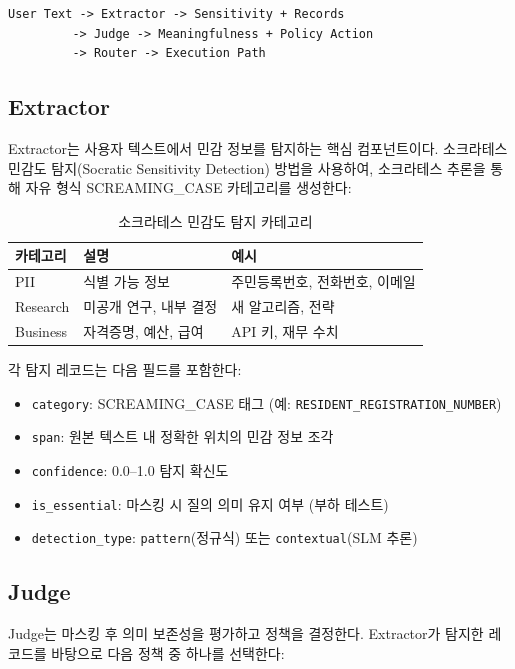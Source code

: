 \documentclass[11pt,a4paper]{article}
\begin{document}
\begin{verbatim}
User Text -> Extractor -> Sensitivity + Records
         -> Judge -> Meaningfulness + Policy Action
         -> Router -> Execution Path
\end{verbatim}

\subsection{Extractor}

Extractor는 사용자 텍스트에서 민감 정보를 탐지하는 핵심 컴포넌트이다. 소크라테스 민감도 탐지(Socratic Sensitivity Detection) 방법을 사용하여, 소크라테스 추론을 통해 자유 형식 SCREAMING\_CASE 카테고리를 생성한다:

\begin{table}[h]
\centering
\begin{tabular}{@{}lll@{}}
\toprule
카테고리 & 설명 & 예시 \\
\midrule
PII & 식별 가능 정보 & 주민등록번호, 전화번호, 이메일 \\
Research & 미공개 연구, 내부 결정 & 새 알고리즘, 전략 \\
Business & 자격증명, 예산, 급여 & API 키, 재무 수치 \\
\bottomrule
\end{tabular}
\caption{소크라테스 민감도 탐지 카테고리}
\end{table}

각 탐지 레코드는 다음 필드를 포함한다:

\begin{itemize}[nosep]
  \item \texttt{category}: SCREAMING\_CASE 태그 (예: \texttt{RESIDENT\_REGISTRATION\_NUMBER})
  \item \texttt{span}: 원본 텍스트 내 정확한 위치의 민감 정보 조각
  \item \texttt{confidence}: 0.0--1.0 탐지 확신도
  \item \texttt{is\_essential}: 마스킹 시 질의 의미 유지 여부 (부하 테스트)
  \item \texttt{detection\_type}: \texttt{pattern}(정규식) 또는 \texttt{contextual}(SLM 추론)
\end{itemize}

\subsection{Judge}

Judge는 마스킹 후 의미 보존성을 평가하고 정책을 결정한다. Extractor가 탐지한 레코드를 바탕으로 다음 정책 중 하나를 선택한다:
\end{document}
